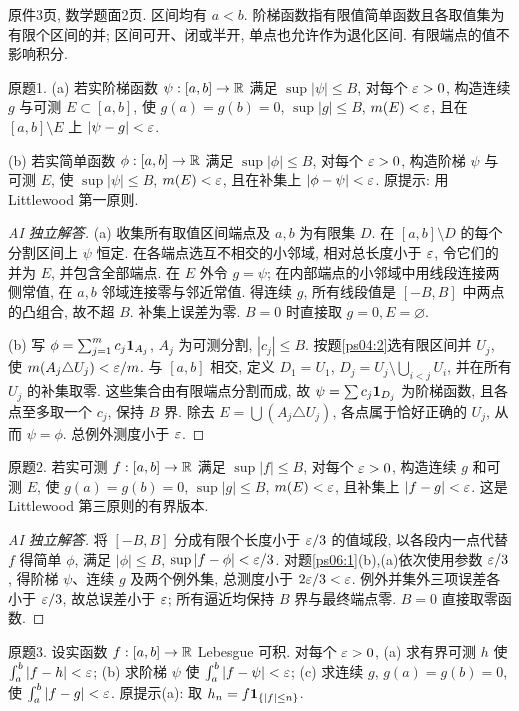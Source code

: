 \label{sec:ps06}
原件3页, 数学题面2页. 区间均有 $a<b$. 阶梯函数指有限值简单函数且各取值集为有限个区间的并; 区间可开、闭或半开, 单点也允许作为退化区间. 有限端点的值不影响积分.
\begin{exercise}\label{ps06:1}
原题1. (a) 若实阶梯函数 $\psi:[a,b]\to\mathbb R$ 满足 $\sup|\psi|\le B$, 对每个 $\varepsilon>0$, 构造连续 $g$ 与可测 $E\subset[a,b]$, 使 $g(a)=g(b)=0$, $\sup|g|\le B$, $m(E)<\varepsilon$, 且在 $[a,b]\setminus E$ 上 $|\psi-g|<\varepsilon$.

(b) 若实简单函数 $\phi:[a,b]\to\mathbb R$ 满足 $\sup|\phi|\le B$, 对每个 $\varepsilon>0$, 构造阶梯 $\psi$ 与可测 $E$, 使 $\sup|\psi|\le B$, $m(E)<\varepsilon$, 且在补集上 $|\phi-\psi|<\varepsilon$. 原提示: 用 Littlewood 第一原则.
\end{exercise}
\begin{proof}[AI 独立解答]
(a) 收集所有取值区间端点及 $a,b$ 为有限集 $D$. 在 $[a,b]\setminus D$ 的每个分割区间上 $\psi$ 恒定. 在各端点选互不相交的小邻域, 相对总长度小于 $\varepsilon$, 令它们的并为 $E$, 并包含全部端点. 在 $E$ 外令 $g=\psi$; 在内部端点的小邻域中用线段连接两侧常值, 在 $a,b$ 邻域连接零与邻近常值. 得连续 $g$, 所有线段值是 $[-B,B]$ 中两点的凸组合, 故不超 $B$. 补集上误差为零. $B=0$ 时直接取 $g=0,E=\varnothing$.

(b) 写 $\phi=\sum_{j=1}^m c_j\mathbf 1_{A_j}$, $A_j$ 为可测分割, $|c_j|\le B$. 按题\ref{ps04:2}选有限区间并 $U_j$, 使 $m(A_j\triangle U_j)<\varepsilon/m$. 与 $[a,b]$ 相交, 定义 $D_1=U_1$, $D_j=U_j\setminus\bigcup_{i<j}U_i$, 并在所有 $U_j$ 的补集取零. 这些集合由有限端点分割而成, 故 $\psi=\sum c_j\mathbf 1_{D_j}$ 为阶梯函数, 且各点至多取一个 $c_j$, 保持 $B$ 界. 除去 $E=\bigcup(A_j\triangle U_j)$, 各点属于恰好正确的 $U_j$, 从而 $\psi=\phi$. 总例外测度小于 $\varepsilon$.
\end{proof}
\begin{exercise}\label{ps06:2}
原题2. 若实可测 $f:[a,b]\to\mathbb R$ 满足 $\sup|f|\le B$, 对每个 $\varepsilon>0$, 构造连续 $g$ 和可测 $E$, 使 $g(a)=g(b)=0$, $\sup|g|\le B$, $m(E)<\varepsilon$, 且补集上 $|f-g|<\varepsilon$. 这是 Littlewood 第三原则的有界版本.
\end{exercise}
\begin{proof}[AI 独立解答]
将 $[-B,B]$ 分成有限个长度小于 $\varepsilon/3$ 的值域段, 以各段内一点代替 $f$ 得简单 $\phi$, 满足 $|\phi|\le B$, $\sup|f-\phi|<\varepsilon/3$. 对题\ref{ps06:1}(b),(a)依次使用参数 $\varepsilon/3$, 得阶梯 $\psi$、连续 $g$ 及两个例外集, 总测度小于 $2\varepsilon/3<\varepsilon$. 例外并集外三项误差各小于 $\varepsilon/3$, 故总误差小于 $\varepsilon$; 所有逼近均保持 $B$ 界与最终端点零. $B=0$ 直接取零函数.
\end{proof}
\begin{exercise}\label{ps06:3}
原题3. 设实函数 $f:[a,b]\to\mathbb R$ Lebesgue 可积. 对每个 $\varepsilon>0$, (a) 求有界可测 $h$ 使 $\int_a^b|f-h|<\varepsilon$; (b) 求阶梯 $\psi$ 使 $\int_a^b|f-\psi|<\varepsilon$; (c) 求连续 $g$, $g(a)=g(b)=0$, 使 $\int_a^b|f-g|<\varepsilon$. 原提示(a): 取 $h_n=f\mathbf 1_{\{|f|\le n\}}$.
\end{exercise}
